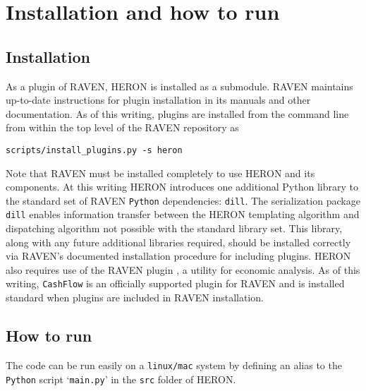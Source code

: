 \section{ Installation and how to run}
\subsection{Installation}
As a plugin of RAVEN, HERON is installed as a submodule. RAVEN maintains up-to-date
instructions for plugin installation in its manuals and other documentation. As of this writing, plugins
are installed from the command line from within the top level of the RAVEN repository as
\begin{verbatim}
scripts/install_plugins.py ‐s heron
\end{verbatim}
Note that RAVEN must be installed completely to use HERON and its components. At this writing
HERON introduces one additional Python library to the standard set of RAVEN \texttt{Python} dependencies:
\texttt{dill}. The serialization package \texttt{dill} enables information transfer between the HERON templating
algorithm and dispatching algorithm not possible with the standard library set. This library, along with
any future additional libraries required, should be installed correctly via RAVEN’s documented
installation procedure for including plugins.
HERON also requires use of the RAVEN plugin , a utility for economic analysis.
As of this writing, \texttt{CashFlow} is an officially supported plugin for RAVEN and is installed standard when plugins are included in RAVEN installation. 
\subsection{How to run}
The code can be run easily on a \texttt{linux/mac} system by defining an alias to the \texttt{Python} script `\texttt{main.py}' in the \texttt{src} folder of  HERON.
